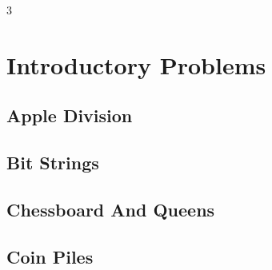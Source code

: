 \documentclass[8pt]{extarticle}
\begin{document}
\begin{multicols*}{3}

\section{Introductory Problems}

\subsection{Apple Division}
\begin{caixaenunciado}

\end{caixaenunciado}
\vspace{0.3cm}


\subsection{Bit Strings}
\begin{caixaenunciado}

\end{caixaenunciado}
\vspace{0.3cm}


\subsection{Chessboard And Queens}
\begin{caixaenunciado}

\end{caixaenunciado}
\vspace{0.3cm}


\subsection{Coin Piles}
\begin{caixaenunciado}

\end{caixaenunciado}
\vspace{0.3cm}



\end{multicols*}
\end{document}
